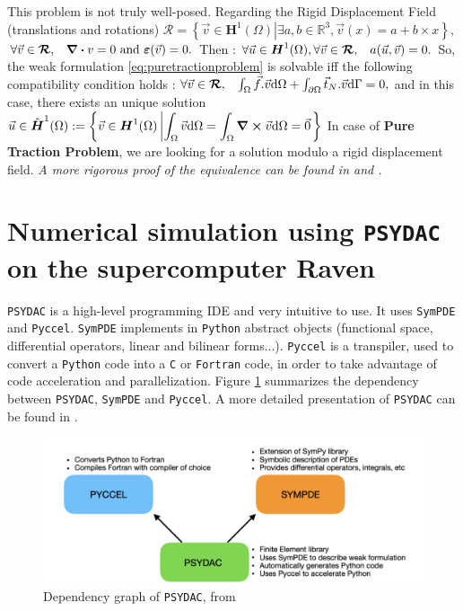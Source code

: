 \documentclass[a4paper,12pt,twoside]{report}
\newcommand{\mtr}{\mathbb{R}}
\newcommand{\dif}{\mathrm{d}}
\begin{document}
This problem is not truly well-posed. Regarding the Rigid Displacement Field (translations and rotations) $\boldsymbol{\mathcal{R}} = \left\{\vec v \in \boldsymbol H^1(\Omega) \left| \exists a, b \in \mtr^3, \vec v(x) = a + b \times x \right. \right\}$, $\forall \vec v \in \boldsymbol{\mathcal{R}}, \hspace{0.3cm} \div v = 0 \text{ and } \boldsymbol \varepsilon(\vec v) = 0.$
Then : $\forall \vec u \in \boldsymbol H^1(\Omega), \forall \vec v \in \boldsymbol{\mathcal{R}},\hspace{0.3cm} a(\vec u, \vec v)= 0.$
So, the weak formulation \eqref{eq:puretractionproblem} is solvable iff the following compatibility condition holds : $\forall \vec v \in \boldsymbol{\mathcal{R}}, \hspace{0.3cm}\int_\Omega \vec f . \vec v \dif \Omega + \int_{\partial\Omega} \vec t_N.\vec v \dif \Gamma = 0,$
and in this case, there exists an unique solution $\vec u \in \hat{\boldsymbol H}^1(\Omega) := \left\{\vec v \in \boldsymbol H^1(\Omega) \left| \displaystyle \int_\Omega \vec v \dif \Omega = \int_\Omega  \curl \vec v \dif \Omega = \vec 0 \right. \right\}$ 
In case of \textbf{Pure Traction Problem}, we are looking for a solution modulo a rigid displacement field.
\textit{A more rigorous proof of the equivalence can be found in \cite{brenner_mathematical_2008} and \cite{chen_variational}.}


\section{Numerical simulation using \texttt{PSYDAC} on the supercomputer Raven}

\texttt{PSYDAC} is a high-level programming IDE and very intuitive to use. It uses \texttt{SymPDE} and \texttt{Pyccel}. \texttt{SymPDE} implements in \texttt{Python} abstract objects (functional space, differential operators, linear and bilinear forms...). \texttt{Pyccel} is a transpiler, used to convert a \texttt{Python} code into a \texttt{C} or \texttt{Fortran} code, in order to take advantage of code acceleration and parallelization. Figure \ref{fig:Dependancy_Psydac} summarizes the dependency between \texttt{PSYDAC}, \texttt{SymPDE} and \texttt{Pyccel}. A more detailed presentation of \texttt{PSYDAC} can be found in \cite{guclu_psydac_2022}.

\begin{figure}[!h]
	\centering
	\includegraphics[width=0.75\linewidth]{figures/psydac_fonc_1.png}
	\caption{Dependency graph of \texttt{PSYDAC}, from \cite{guclu_psydac_2022}}
	\label{fig:Dependancy_Psydac}
\end{figure}
\end{document}
